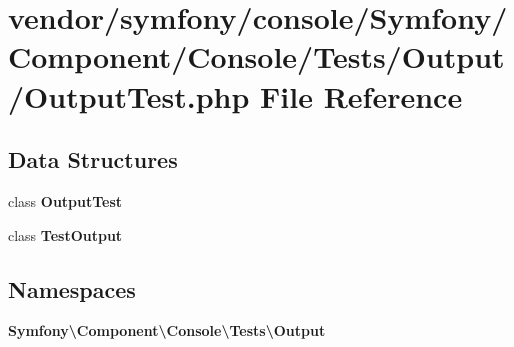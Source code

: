 \section{vendor/symfony/console/\+Symfony/\+Component/\+Console/\+Tests/\+Output/\+Output\+Test.php File Reference}
\label{_output_test_8php}
\subsection*{Data Structures}
\begin{DoxyCompactItemize}
\item 
class {\bf Output\+Test}
\item 
class {\bf Test\+Output}
\end{DoxyCompactItemize}
\subsection*{Namespaces}
\begin{DoxyCompactItemize}
\item 
 {\bf Symfony\textbackslash{}\+Component\textbackslash{}\+Console\textbackslash{}\+Tests\textbackslash{}\+Output}
\end{DoxyCompactItemize}

